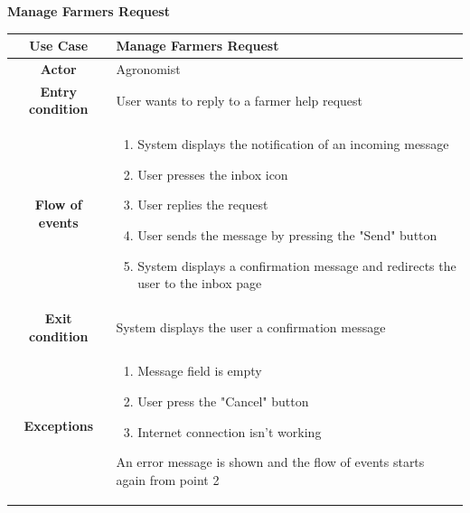 \documentclass[table, 12pt]{article}
\begin{document}
\begin{itemize}
            \begin{table}[H]
                \item[] \textbf{Manage Farmers Request}
                \item[] 
                \centering
                \begin{tabular}{|c| m{}|}
                    \hline
                    \textbf{Use Case} & Manage Farmers Request\\ \hline
                    \textbf{Actor} & Agronomist\\ \hline
                    \textbf{Entry condition} & User wants to reply to a farmer help request\\  \hline
                    \textbf{Flow of events} & \begin{enumerate}
                                                \item System displays the notification of an incoming message
                                                \item User presses the inbox icon
                                                \item User replies the request
                                                \item User sends the message by pressing the "Send" button
                                                \item System displays a confirmation message and redirects the user to the inbox page
                                            \end{enumerate}\\ \hline
                    \textbf{Exit condition} & System displays the user a confirmation message\\ \hline
                    \textbf{Exceptions} &  \begin{enumerate}
                        \item Message field is empty 
                        \item User press the "Cancel" button
                        \item Internet connection isn't working   
                    \end{enumerate}
                    An error message is shown and the flow of events starts again from point 2\\ \hline                    
                \end{tabular}
            \end{table}


\end{itemize}
\end{document}
